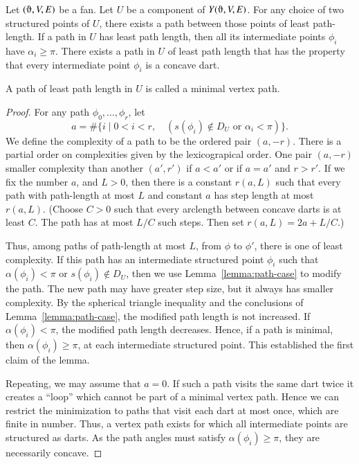 \begin{lemma}
Let $(\orgn,V,E)$ be a fan.  Let $U$ be a component of $Y(\orgn,V,E)$.
For any choice of two structured points of $U$, there exists a path
between those points of least path-length.
If a path in $U$ has least path length, then
all its intermediate points $\phi_i$ have 
$\alpha_i\ge\pi$.  There exists a path in $U$ of least path
length that has the property that every intermediate point $\phi_i$
is a concave dart.
\end{lemma}

\begin{definition} A path of least path length in $U$
is called a minimal
vertex path.
\end{definition}

\begin{proof}  
For
any path $\phi_0,\ldots,\phi_r$, let
   $$a = \#\{i \mid 0 < i < r,\quad (s(\phi_i)\not\in D_U \text{ or }
       \alpha_i < \pi)\}.$$
We define the complexity of a path to be the ordered pair $(a,-r)$.
There is a partial order on complexities given by the lexicograpical order.
One pair $(a,-r)$ smaller complexity than another $(a',r')$ if $a<a'$
or if $a=a'$ and $r>r'$.  If we fix the number $a$, and  $L>0$, then there is a constant $r(a,L)$ such
that every path with path-length at most $L$ and constant $a$ has step length at
most $r(a,L)$.  (Choose $C>0$ such that every
arclength between concave darts is at least $C$. The path has at most $L/C$ such steps.  Then set $r(a,L) = 2 a + L/C$.)

Thus, among paths of path-length at most $L$, from $\phi$ to $\phi'$,
there is one of least complexity. If this path
has an intermediate structured point $\phi_i$ such that 
$\alpha(\phi_i)<\pi$ or $s(\phi_i)\not\in D_U$, then we use 
Lemma~\ref{lemma:path-case} to modify the path.  The new path
may have greater step size, but it always has smaller complexity.
By the spherical triangle inequality and the conclusions of Lemma~\ref{lemma:path-case}, the modified path length is not increased.
If $\alpha(\phi_i)<\pi$, the modified path length decreases.  
Hence, if a path is minimal, then $\alpha(\phi_i)\ge\pi$, at each intermediate structured point.  This established the first
claim of the lemma.

Repeating, we may assume that $a=0$.  If such a path visits the same dart twice it creates a ``loop'' which cannot be part of a minimal  vertex path. Hence we can restrict the minimization to paths that visit each dart at most once, which are finite in number.  Thus, a vertex path exists for which all intermediate points are structured as darts.  As the path angles must satisfy $\alpha(\phi_i)\ge\pi$, they are necessarily concave.
\end{proof}



